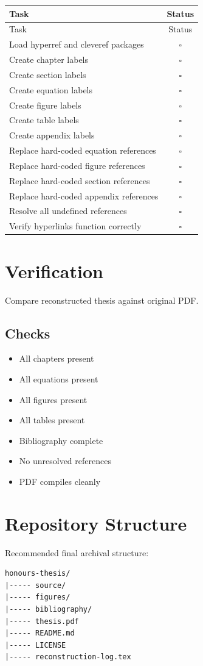 \documentclass{article}
\newcommand{\pending}{$\square$}
\begin{document}
\begin{longtable}{|p{8cm}|c|}
\hline
Task & Status \\
\hline
\endfirsthead

\hline
Task & Status \\
\hline
\endhead

Load hyperref and cleveref packages & \pending \\
Create chapter labels & \pending \\
Create section labels & \pending \\
Create equation labels & \pending \\
Create figure labels & \pending \\
Create table labels & \pending \\
Create appendix labels & \pending \\
Replace hard-coded equation references & \pending \\
Replace hard-coded figure references & \pending \\
Replace hard-coded section references & \pending \\
Replace hard-coded appendix references & \pending \\
Resolve all undefined references & \pending \\
Verify hyperlinks function correctly & \pending \\
\hline
\end{longtable}

\section{Verification}

Compare reconstructed thesis against original PDF.

\subsection{Checks}

\begin{itemize}
\item[\pending] All chapters present
\item[\pending] All equations present
\item[\pending] All figures present
\item[\pending] All tables present
\item[\pending] Bibliography complete
\item[\pending] No unresolved references
\item[\pending] PDF compiles cleanly
\end{itemize}

\section*{Repository Structure}

Recommended final archival structure:

\begin{verbatim}
honours-thesis/
|----- source/
|----- figures/
|----- bibliography/
|----- thesis.pdf
|----- README.md
|----- LICENSE
|----- reconstruction-log.tex
\end{verbatim}
\end{document}
